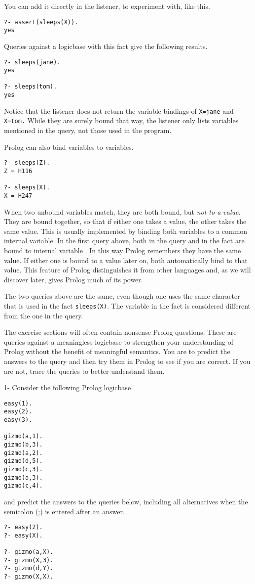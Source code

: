 You can add it directly in the listener, to experiment with, like this.
\begin{verbatim}
?- assert(sleeps(X)).
yes
\end{verbatim}

Queries against a logicbase with this fact give the following results.
\begin{verbatim}
?- sleeps(jane).
yes

?- sleeps(tom).
yes
\end{verbatim}
Notice that the listener does not return the variable bindings of \verb'X=jane'
and \verb'X=tom.' While they are surely bound that way, the listener only lists
variables mentioned in the query, not those used in the program.

Prolog can also bind variables to variables.
\begin{verbatim}
?- sleeps(Z).
Z = H116

?- sleeps(X).
X = H247
\end{verbatim}
When two unbound variables match, they are both bound, but \emph{not to a
value}. They are bound together, so that if either one takes a value, the other
takes the same value. This is usually implemented by binding both variables to a
common internal variable. In the first query above, both  in the query
and  in the fact are bound to internal variable . In this way
Prolog remembers they have the same value. If either one is bound to a value
later on, both automatically bind to that value. This feature of Prolog
distinguishes it from other languages and, as we will discover later, gives
Prolog much of its power.

The two queries above are the same, even though one uses the same character
 that is used in the fact \verb'sleeps(X)'. The variable in the fact is
considered different from the one in the query.

\secdown

The exercise sections will often contain nonsense Prolog questions. These are
queries against a meaningless logicbase to strengthen your understanding of
Prolog without the benefit of meaningful semantics. You are to predict the
answers to the query and then try them in Prolog to see if you are correct. If
you are not, trace the queries to better understand them.


1- Consider the following Prolog logicbase
\begin{verbatim}
easy(1).
easy(2).
easy(3).

gizmo(a,1).
gizmo(b,3).
gizmo(a,2).
gizmo(d,5).
gizmo(c,3).
gizmo(a,3).
gizmo(c,4).
\end{verbatim}
and predict the answers to the queries below, including all alternatives when
the semicolon (;) is entered after an answer.
\begin{verbatim}
?- easy(2).
?- easy(X).

?- gizmo(a,X).
?- gizmo(X,3).
?- gizmo(d,Y).
?- gizmo(X,X).
\end{verbatim}

